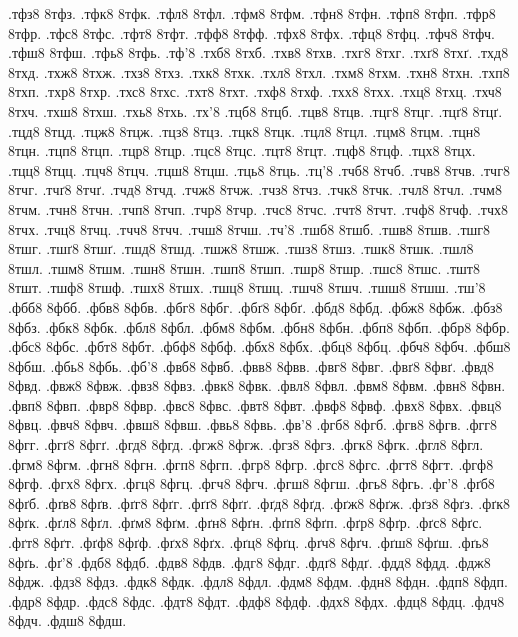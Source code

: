 {.тфз8 8тфз.
.тфк8 8тфк.
.тфл8 8тфл.
.тфм8 8тфм.
.тфн8 8тфн.
.тфп8 8тфп.
.тфр8 8тфр.
.тфс8 8тфс.
.тфт8 8тфт.
.тфф8 8тфф.
.тфх8 8тфх.
.тфц8 8тфц.
.тфч8 8тфч.
.тфш8 8тфш.
.тфь8 8тфь.
.тф'8
.тхб8 8тхб.
.тхв8 8тхв.
.тхг8 8тхг.
.тхґ8 8тхґ.
.тхд8 8тхд.
.тхж8 8тхж.
.тхз8 8тхз.
.тхк8 8тхк.
.тхл8 8тхл.
.тхм8 8тхм.
.тхн8 8тхн.
.тхп8 8тхп.
.тхр8 8тхр.
.тхс8 8тхс.
.тхт8 8тхт.
.тхф8 8тхф.
.тхх8 8тхх.
.тхц8 8тхц.
.тхч8 8тхч.
.тхш8 8тхш.
.тхь8 8тхь.
.тх'8
.тцб8 8тцб.
.тцв8 8тцв.
.тцг8 8тцг.
.тцґ8 8тцґ.
.тцд8 8тцд.
.тцж8 8тцж.
.тцз8 8тцз.
.тцк8 8тцк.
.тцл8 8тцл.
.тцм8 8тцм.
.тцн8 8тцн.
.тцп8 8тцп.
.тцр8 8тцр.
.тцс8 8тцс.
.тцт8 8тцт.
.тцф8 8тцф.
.тцх8 8тцх.
.тцц8 8тцц.
.тцч8 8тцч.
.тцш8 8тцш.
.тць8 8тць.
.тц'8
.тчб8 8тчб.
.тчв8 8тчв.
.тчг8 8тчг.
.тчґ8 8тчґ.
.тчд8 8тчд.
.тчж8 8тчж.
.тчз8 8тчз.
.тчк8 8тчк.
.тчл8 8тчл.
.тчм8 8тчм.
.тчн8 8тчн.
.тчп8 8тчп.
.тчр8 8тчр.
.тчс8 8тчс.
.тчт8 8тчт.
.тчф8 8тчф.
.тчх8 8тчх.
.тчц8 8тчц.
.тчч8 8тчч.
.тчш8 8тчш.
.тч'8
.тшб8 8тшб.
.тшв8 8тшв.
.тшг8 8тшг.
.тшґ8 8тшґ.
.тшд8 8тшд.
.тшж8 8тшж.
.тшз8 8тшз.
.тшк8 8тшк.
.тшл8 8тшл.
.тшм8 8тшм.
.тшн8 8тшн.
.тшп8 8тшп.
.тшр8 8тшр.
.тшс8 8тшс.
.тшт8 8тшт.
.тшф8 8тшф.
.тшх8 8тшх.
.тшц8 8тшц.
.тшч8 8тшч.
.тшш8 8тшш.
.тш'8
.фбб8 8фбб.
.фбв8 8фбв.
.фбг8 8фбг.
.фбґ8 8фбґ.
.фбд8 8фбд.
.фбж8 8фбж.
.фбз8 8фбз.
.фбк8 8фбк.
.фбл8 8фбл.
.фбм8 8фбм.
.фбн8 8фбн.
.фбп8 8фбп.
.фбр8 8фбр.
.фбс8 8фбс.
.фбт8 8фбт.
.фбф8 8фбф.
.фбх8 8фбх.
.фбц8 8фбц.
.фбч8 8фбч.
.фбш8 8фбш.
.фбь8 8фбь.
.фб'8
.фвб8 8фвб.
.фвв8 8фвв.
.фвг8 8фвг.
.фвґ8 8фвґ.
.фвд8 8фвд.
.фвж8 8фвж.
.фвз8 8фвз.
.фвк8 8фвк.
.фвл8 8фвл.
.фвм8 8фвм.
.фвн8 8фвн.
.фвп8 8фвп.
.фвр8 8фвр.
.фвс8 8фвс.
.фвт8 8фвт.
.фвф8 8фвф.
.фвх8 8фвх.
.фвц8 8фвц.
.фвч8 8фвч.
.фвш8 8фвш.
.фвь8 8фвь.
.фв'8
.фгб8 8фгб.
.фгв8 8фгв.
.фгг8 8фгг.
.фгґ8 8фгґ.
.фгд8 8фгд.
.фгж8 8фгж.
.фгз8 8фгз.
.фгк8 8фгк.
.фгл8 8фгл.
.фгм8 8фгм.
.фгн8 8фгн.
.фгп8 8фгп.
.фгр8 8фгр.
.фгс8 8фгс.
.фгт8 8фгт.
.фгф8 8фгф.
.фгх8 8фгх.
.фгц8 8фгц.
.фгч8 8фгч.
.фгш8 8фгш.
.фгь8 8фгь.
.фг'8
.фґб8 8фґб.
.фґв8 8фґв.
.фґг8 8фґг.
.фґґ8 8фґґ.
.фґд8 8фґд.
.фґж8 8фґж.
.фґз8 8фґз.
.фґк8 8фґк.
.фґл8 8фґл.
.фґм8 8фґм.
.фґн8 8фґн.
.фґп8 8фґп.
.фґр8 8фґр.
.фґс8 8фґс.
.фґт8 8фґт.
.фґф8 8фґф.
.фґх8 8фґх.
.фґц8 8фґц.
.фґч8 8фґч.
.фґш8 8фґш.
.фґь8 8фґь.
.фґ'8
.фдб8 8фдб.
.фдв8 8фдв.
.фдг8 8фдг.
.фдґ8 8фдґ.
.фдд8 8фдд.
.фдж8 8фдж.
.фдз8 8фдз.
.фдк8 8фдк.
.фдл8 8фдл.
.фдм8 8фдм.
.фдн8 8фдн.
.фдп8 8фдп.
.фдр8 8фдр.
.фдс8 8фдс.
.фдт8 8фдт.
.фдф8 8фдф.
.фдх8 8фдх.
.фдц8 8фдц.
.фдч8 8фдч.
.фдш8 8фдш.
}
